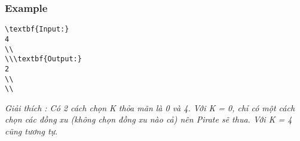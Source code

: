 \subsubsection{   Example  }
\begin{verbatim}
\textbf{Input:}
4
\\
\\\textbf{Output:}
2
\\
\\\end{verbatim}

\emph{     Giải thích        : Có 2 cách chọn K thỏa mãn là 0 và 4. Với K = 0, chỉ có một cách chọn các đồng xu (không chọn đồng xu nào cả) nên Pirate sẽ thua. Với K = 4 cũng tương tự.    
\\}